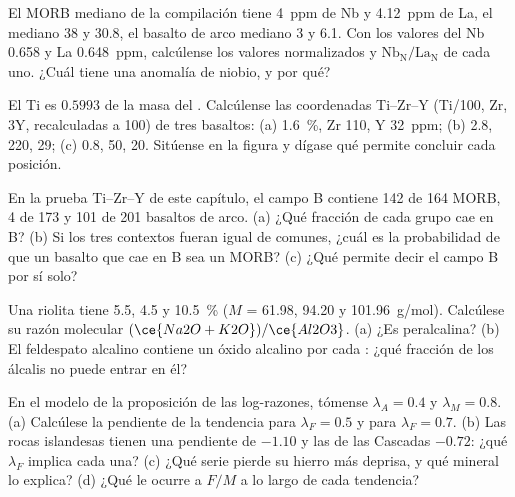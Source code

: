 \begin{exercise}[$\star\star$]\label{exo:b2:magmatic-series:6}
El MORB mediano de la compilación tiene \qty{4}{ppm} de Nb y \qty{4.12}{ppm} de La, el
 mediano 38 y 30.8, el basalto de arco mediano 3 y 6.1. Con los
valores del  Nb 0.658 y La \qty{0.648}{ppm}, calcúlense los valores normalizados
y $\mathrm{Nb_N}/\mathrm{La_N}$ de cada uno. ¿Cuál tiene una anomalía de niobio, y por qué?
\end{exercise}

\begin{exercise}[$\star\star$]\label{exo:b2:magmatic-series:7}
El Ti es $0.5993$ de la masa del . Calcúlense las coordenadas Ti--Zr--Y
(Ti/100, Zr, $3\mathrm Y$, recalculadas a 100) de tres basaltos: (a) 
\qty{1.6}{\percent}, Zr 110, Y \qty{32}{ppm}; (b) 2.8, 220, 29; (c) 0.8, 50, 20. Sitúense
en la figura y dígase qué permite concluir cada posición.
\end{exercise}

\begin{exercise}[$\star\star$]\label{exo:b2:magmatic-series:8}
En la prueba Ti--Zr--Y de este capítulo, el campo B contiene 142 de 164 MORB, 4 de 173
 y 101 de 201 basaltos de arco. (a) ¿Qué fracción de cada grupo cae
en B? (b) Si los tres contextos fueran igual de comunes, ¿cuál es la probabilidad de que un
basalto que cae en B sea un MORB? (c) ¿Qué permite decir el campo B por sí solo?
\end{exercise}

\begin{exercise}[$\star\star$]\label{exo:b2:magmatic-series:9}
Una riolita tiene  5.5,  4.5 y  \qty{10.5}{\percent} ($M$ =
61.98, 94.20 y \qty{101.96}{g/mol}). Calcúlese su razón molecular $(\ce{Na2O +
K2O})/\ce{Al2O3}$. (a) ¿Es peralcalina? (b) El feldespato alcalino contiene un
óxido alcalino por cada : ¿qué fracción de los álcalis no puede entrar en él?
\end{exercise}

\begin{exercise}[$\star\star\star$]\label{exo:b2:magmatic-series:10}
En el modelo de la proposición de las log-razones, tómense $\lambda_A = 0.4$ y $\lambda_M =
0.8$. (a) Calcúlese la pendiente de la tendencia para $\lambda_F = 0.5$ y para $\lambda_F =
0.7$. (b) Las rocas islandesas tienen una pendiente de $-1.10$ y las de las Cascadas
$-0.72$: ¿qué $\lambda_F$ implica cada una? (c) ¿Qué serie pierde su hierro más deprisa,
y qué mineral lo explica? (d) ¿Qué le ocurre a $F/M$ a lo largo de cada tendencia?
\end{exercise}

